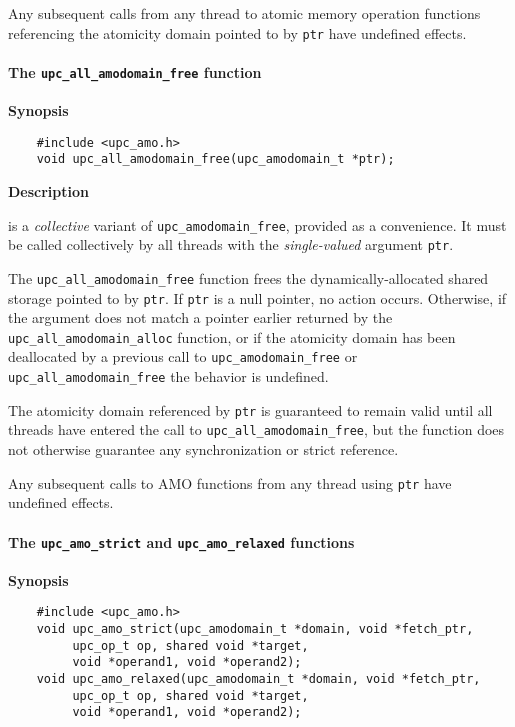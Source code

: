 \np Any subsequent calls from any thread to atomic memory operation functions
    referencing the atomicity domain pointed to by {\tt ptr} have undefined
    effects.

\paragraph{The {\tt upc\_all\_amodomain\_free} function}

{\bf Synopsis}

\npf\vspace{-1.8em}
\begin{verbatim}
    #include <upc_amo.h>
    void upc_all_amodomain_free(upc_amodomain_t *ptr);
\end{verbatim}

{\bf Description}

 is a \emph{collective} variant of
    {\tt upc\_amodomain\_free}, provided as a convenience.  It must be called
    collectively by all threads with the \emph{single-valued} argument
    {\tt ptr}.

\np The {\tt upc\_all\_amodomain\_free} function frees the dynamically-allocated
    shared storage pointed to by {\tt ptr}.  If {\tt ptr} is a null pointer,
    no action occurs.  Otherwise, if the argument does not match a pointer
    earlier returned by the {\tt upc\_all\_amodomain\_alloc} function, or if
    the atomicity domain has been deallocated by a previous call to
    {\tt upc\_amodomain\_free} or {\tt upc\_all\_amodomain\_free} the
    behavior is undefined.

\np The atomicity domain referenced by {\tt ptr} is guaranteed to remain valid
    until all threads have entered the call to {\tt upc\_all\_amodomain\_free},
    but the function does not otherwise guarantee any synchronization or
    strict reference.

\np Any subsequent calls to AMO functions from any thread using {\tt ptr} have
    undefined effects.

\paragraph{The {\tt upc\_amo\_strict} and {\tt upc\_amo\_relaxed} functions}

{\bf Synopsis}

\npf\vspace{-1.8em}
\begin{verbatim}
    #include <upc_amo.h>
    void upc_amo_strict(upc_amodomain_t *domain, void *fetch_ptr,
         upc_op_t op, shared void *target,
         void *operand1, void *operand2);
    void upc_amo_relaxed(upc_amodomain_t *domain, void *fetch_ptr,
         upc_op_t op, shared void *target,
         void *operand1, void *operand2);
\end{verbatim}

